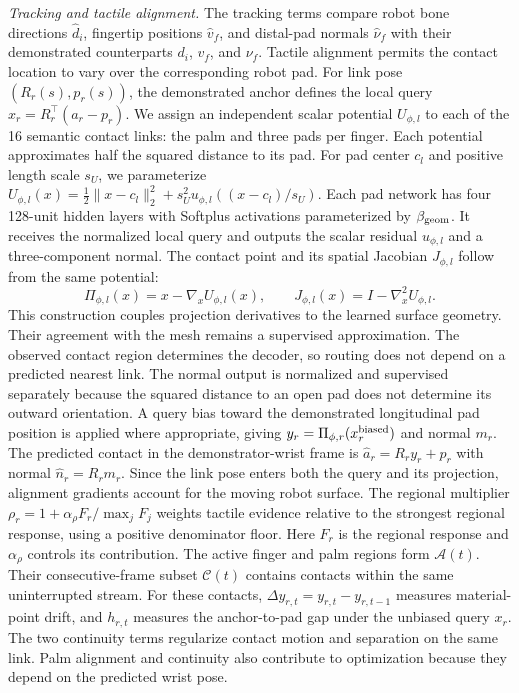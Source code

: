 \textit{Tracking and tactile alignment.} The tracking terms compare robot bone directions $\hat d_i$, fingertip positions $\hat v_f$, and distal-pad normals $\hat\nu_f$ with their demonstrated counterparts $d_i$, $v_f$, and $\nu_f$. Tactile alignment permits the contact location to vary over the corresponding robot pad. For link pose $(R_r(s),p_r(s))$, the demonstrated anchor defines the local query $x_r=R_r^\top(a_r-p_r)$. We assign an independent scalar potential $U_{\phi,l}$ to each of the 16 semantic contact links: the palm and three pads per finger. Each potential approximates half the squared distance to its pad. For pad center $c_l$ and positive length scale $s_U$, we parameterize $U_{\phi,l}(x)=\tfrac12\|x-c_l\|_2^2+s_U^2u_{\phi,l}((x-c_l)/s_U)$. Each pad network has four 128-unit hidden layers with Softplus activations parameterized by $\beta_{\rm geom}$. It receives the normalized local query and outputs the scalar residual $u_{\phi,l}$ and a three-component normal. The contact point and its spatial Jacobian $J_{\phi,l}$ follow from the same potential:
\begin{equation}
    \Pi_{\phi,l}(x)=x-\nabla_x U_{\phi,l}(x),\qquad
    J_{\phi,l}(x)=I-\nabla_x^2U_{\phi,l}.
    \label{eq:cart-pad-potential}
\end{equation}
This construction couples projection derivatives to the learned surface geometry. Their agreement with the mesh remains a supervised approximation. The observed contact region determines the decoder, so routing does not depend on a predicted nearest link. The normal output is normalized and supervised separately because the squared distance to an open pad does not determine its outward orientation. A query bias toward the demonstrated longitudinal pad position is applied where appropriate, giving $y_r=\Pi_{\phi,r}(x_r^{\rm biased})$ and normal $m_r$. The predicted contact in the demonstrator-wrist frame is $\hat a_r=R_r y_r+p_r$ with normal $\hat n_r=R_r m_r$. Since the link pose enters both the query and its projection, alignment gradients account for the moving robot surface. The regional multiplier $\rho_r=1+\alpha_\rho F_r/\max_j F_j$ weights tactile evidence relative to the strongest regional response, using a positive denominator floor. Here $F_r$ is the regional response and $\alpha_\rho$ controls its contribution. The active finger and palm regions form $\mathcal A(t)$. Their consecutive-frame subset $\mathcal C(t)$ contains contacts within the same uninterrupted stream. For these contacts, $\Delta y_{r,t}=y_{r,t}-y_{r,t-1}$ measures material-point drift, and $h_{r,t}$ measures the anchor-to-pad gap under the unbiased query $x_r$. The two continuity terms regularize contact motion and separation on the same link. Palm alignment and continuity also contribute to optimization because they depend on the predicted wrist pose.

